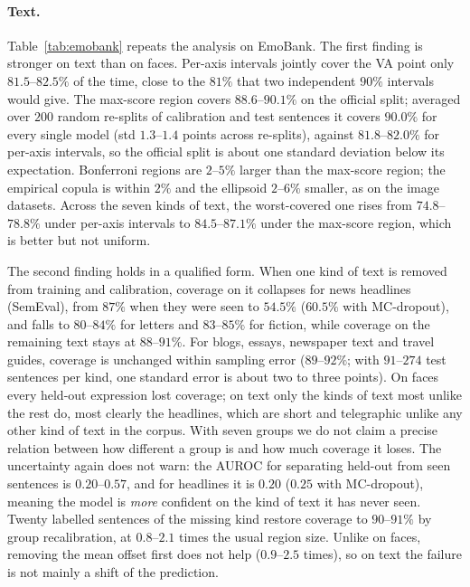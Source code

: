 \paragraph{Text.}
Table~\ref{tab:emobank} repeats the analysis on EmoBank. The first finding is
stronger on text than on faces. Per-axis intervals jointly cover the VA point
only $81.5$--$82.5\%$ of the time, close to the $81\%$ that two independent
$90\%$ intervals would give. The max-score region covers $88.6$--$90.1\%$ on the
official split; averaged over $200$ random re-splits of calibration and test
sentences it covers $90.0\%$ for every single model (std $1.3$--$1.4$ points
across re-splits), against $81.8$--$82.0\%$ for per-axis intervals, so the
official split is about one standard deviation below its expectation.
Bonferroni regions are $2$--$5\%$ larger than the max-score region; the
empirical copula is within $2\%$ and the ellipsoid $2$--$6\%$ smaller, as on
the image datasets. Across the seven kinds of text, the worst-covered one rises
from $74.8$--$78.8\%$ under per-axis intervals to $84.5$--$87.1\%$ under the
max-score region, which is better but not uniform.

The second finding holds in a qualified form. When one kind of text is removed
from training and calibration, coverage on it collapses for news headlines
(SemEval), from $87\%$ when they were seen to $54.5\%$ ($60.5\%$ with
MC-dropout), and falls to $80$--$84\%$ for letters and $83$--$85\%$ for
fiction, while coverage on the remaining text stays at $88$--$91\%$. For blogs,
essays, newspaper text and travel guides, coverage is unchanged within
sampling error ($89$--$92\%$; with $91$--$274$ test sentences per kind, one
standard error is about two to three points). On faces every held-out
expression lost coverage; on text only the kinds of text most unlike the rest
do, most clearly the headlines, which are short and telegraphic unlike any
other kind of text in the corpus. With seven groups we do not claim a precise
relation between how different a group is and how much coverage it loses. The
uncertainty again does not warn: the AUROC for separating held-out from seen
sentences is $0.20$--$0.57$, and for headlines it is $0.20$ ($0.25$ with
MC-dropout), meaning the model is \emph{more} confident on the kind of text it
has never seen. Twenty labelled sentences of the missing kind restore coverage
to $90$--$91\%$ by group recalibration, at $0.8$--$2.1$ times the usual region
size. Unlike on faces, removing the mean offset first does not help
($0.9$--$2.5$ times), so on text the failure is not mainly a shift of the
prediction.

